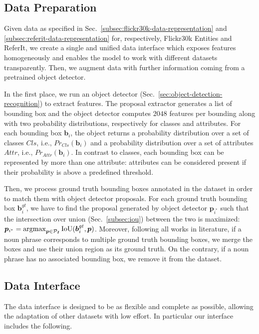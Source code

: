 \subsection{Data Preparation}
\label{subsec:data-preparation}

Given data as specified in
Sec.~\ref{subsec:flickr30k-data-representation} and
\ref{subsec:referit-data-representation} for, respectively, Flickr30k
Entities and ReferIt, we create a single and unified data interface
which exposes features homogeneously and enables the model to work
with different datasets transparently. Then, we augment data with
further information coming from a pretrained object detector.

In the first place, we run an object detector
(Sec.~\ref{sec:object-detection-recognition}) to extract features. The
proposal extractor generates a list of bounding box and the object
detector computes $2048$ features per bounding along with two
probability distributions, respectively for classes and attributes.
For each bounding box $\bm{b}_i$, the object returns a probability
distribution over a set of classes $Cls$, i.e., $Pr_{Cls}(\bm{b}_i)$
and a probability distribution over a set of attributes $Attr$, i.e.,
$Pr_{Attr}(\bm{b}_i)$. In contrast to classes, each bounding box can
be represented by more than one attribute: attributes can be
considered present if their probability is above a predefined
threshold.

Then, we process ground truth bounding boxes annotated in the dataset
in order to match them with object detector proposals. For each ground
truth bounding box $\bm{b}^{gt}_i$, we have to find the proposal
generated by object detector $\bm{p}_{i^*}$ such that the intersection
over union (Sec.~\ref{subsec:iou}) between the two is maximized:
$\bm{p}_{i^*} = \operatorname*{argmax}_{\bm{p} \in \mathcal{P}_{\bm{I}}}
\text{IoU}(\bm{b}^{gt}_i, \bm{p})$. Moreover, following all works in
literature, if a noun phrase corresponds to multiple ground truth
bounding boxes, we merge the boxes and use their union region as its
ground truth. On the contrary, if a noun phrase has no associated
bounding box, we remove it from the dataset.

\subsection{Data Interface}
\label{subsec:data-interface}

The data interface is designed to be as flexible and complete as
possible, allowing the adaptation of other datasets with low effort.
In particular our interface includes the following.

